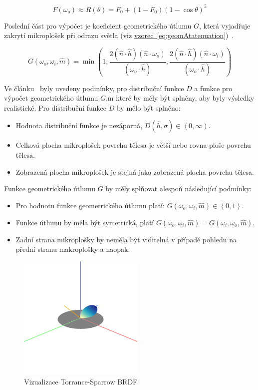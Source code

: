 \documentclass[czech,master]{diploma}
\newcommand{\intervalcc}[2]{\left<{{#1},{#2}}\right>}
\newcommand{\intervalco}[2]{\left<{{#1},{#2}}\right)}
\newcommand{\uvec}[1]{\hat{#1}}
\newcommand{\normVec}{\uvec{n}}
\newcommand{\normMicroVec}{\uvec{m}}
\newcommand{\inVec}{\omega_{i}}
\newcommand{\outVec}{\omega_{o}}
\newcommand{\halfVec}{\uvec{h}}
\newcommand{\rough}{\sigma}
\newcommand{\Fzero}{F_0}
\begin{document}
\begin{equation}\label{eq:schlickFresnel}
  F(\outVec)  \approx R(\theta) = \Fzero + {(1-\Fzero)}{(1-\cos\theta)}^{5}
\end{equation}

Poslední část pro výpočet je koeficient geometrického útlumu \(G\), která vyjadřuje zakrytí mikroplošek při odrazu světla (viz \hyperref[eq:geomAtatenuation]{vzorec~\ref{eq:geomAtatenuation}})~\cite{BRDFOverview}.

\begin{equation}\label{eq:geomAtatenuation}
  G(\outVec,\inVec, \normMicroVec)  =  \min \left( 1, \frac{2 ( \normVec \cdot \halfVec ) ( \normVec \cdot \outVec )
    }{ ( \outVec \cdot \halfVec ) },\frac{ 2 ( \normVec \cdot \halfVec ) ( \normVec \cdot \inVec ) }{ ( \outVec \cdot \halfVec ) } \right)
\end{equation}


Ve článku~\cite{MicrofacetWalter} byly uvedeny podmínky, pro distribuční funkce \(D\) a  funkce pro výpočet geometrického útlumu \(G\),m které by měly být splněny, aby byly výsledky realistické. Pro distribuční funkce \(D\) by mělo být splněno:
\begin{itemize}
  \item Hodnota distribuční funkce je nezáporná, \(D(\halfVec,\rough) \in \intervalco{0}{\infty}\).
  \item Celková plocha mikroplošek povrchu tělesa je větší nebo rovna ploše povrchu tělesa.
  \item Zobrazená plocha mikroplošek je stejná jako zobrazená plocha povrchu tělesa.
\end{itemize}
Funkce geometrického útlumu \(G\) by měly splňovat alespoň následující podmínky:
\begin{itemize}
  \item Pro hodnotu funkce geometrického útlumu platí: \(G(\outVec, \inVec, \normMicroVec) \in \intervalcc{0}{1}\).
  \item Funkce útlumu by měla být symetrická, platí \(G(\outVec, \inVec, \normMicroVec) = G(\inVec, \outVec, \normMicroVec)\).
  \item Zadní strana mikroplošky by neměla být viditelná v případě pohledu na přední stranu makroplošky a naopak.
\end{itemize}

\begin{figure}[ht]%
  \centering\includegraphics[width=6cm]{Figures/visualizations/brdfTorranceSparrow.png}%
  \caption{Vizualizace Torrance-Sparrow BRDF}%
  \label{fig:torranceSparrowBRDFRender}%
\end{figure}
\end{document}
